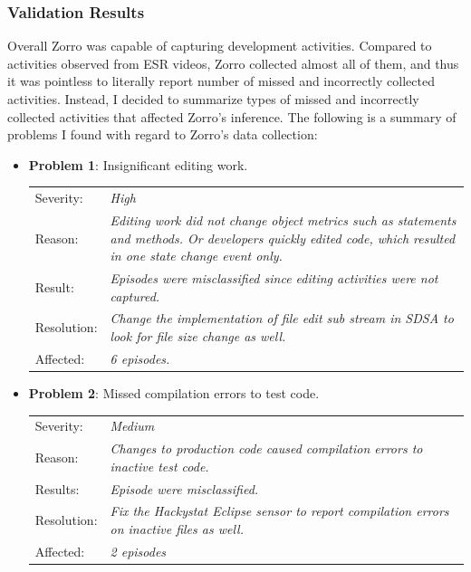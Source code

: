 \subsubsection{Validation Results}
Overall Zorro was capable of capturing development activities. Compared
to activities observed from ESR videos, Zorro collected almost all of 
them, and thus it was pointless to literally report number of missed and 
incorrectly collected activities. Instead, I decided to summarize types 
of missed and incorrectly collected activities that affected Zorro's inference. 
The following is a summary of problems I found with regard to Zorro's 
data collection:
\begin{itemize}
\item \textbf{Problem 1}: Insignificant editing work. 
  \begin{tabular}{lp{10cm}}
   Severity: &  \small\textit{High}\\
   Reason:   &  \small\textit{Editing work did not change object metrics such as 
                         statements and methods. Or developers quickly edited
                         code, which resulted in one state change event only.} \\ 
   Result:    & \small\textit{Episodes were misclassified since editing activities 
                              were not captured.} \\ 
   Resolution: & \small\textit{Change the implementation of file edit 
                           sub stream in SDSA to look for file size 
                           change as well.} \\ 
   Affected: &  \small\textit{6 episodes.}
  \end{tabular}

\item \textbf{Problem 2}: Missed compilation errors to test code.
  \begin{tabular}{lp{10cm}}
    Severity: & \small\textit{Medium}\\
    Reason:   & \small\textit{Changes to production code caused 
                compilation errors to inactive test code.} \\
    Results: & \small\textit{Episode were misclassified.} \\
    Resolution: & \small\textit{Fix the Hackystat Eclipse sensor to report 
                  compilation errors on inactive files as well.}\\
    Affected: & \small\textit{2 episodes}
  \end{tabular}


\end{itemize}
